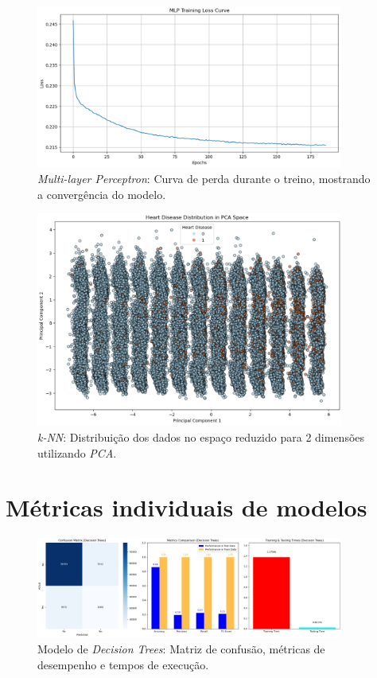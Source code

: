 \begin{figure}[H]
    \centering
    \includegraphics[width=0.9\textwidth]{images/mlp_training_loss.png}
    \caption{\textit{Multi-layer Perceptron}: Curva de perda durante o treino, mostrando a convergência do modelo.}
    \label{fig:mlp_training_loss}
\end{figure}

\begin{figure}[H]
    \centering
    \includegraphics[width=0.9\textwidth]{images/knn_pca.png}
    \caption{\textit{k-NN}: Distribuição dos dados no espaço reduzido para 2 dimensões utilizando \textit{PCA}.}
    \label{fig:knn_pca}
\end{figure}

\section{Métricas individuais de modelos}
\begin{figure}[H]
    \centering
    \includegraphics[width=0.9\textwidth]{images/decision_tree_overview.png}
    \caption{Modelo de \textit{Decision Trees}: Matriz de confusão, métricas de desempenho e tempos de execução.}
    \label{fig:decision_tree_overview}
\end{figure}

